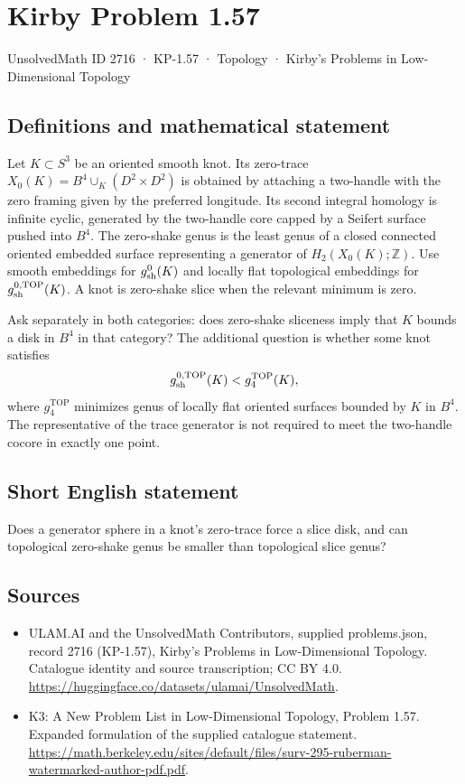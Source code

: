 \documentclass[11pt,a4paper]{article}
\begin{document}
\section*{Kirby Problem 1.57}\label{2716}
{\small UnsolvedMath ID 2716 · KP-1.57 · Topology · Kirby's Problems in Low-Dimensional Topology}
\subsection{Definitions and mathematical statement}
Let $K\subset S^3$ be an oriented smooth knot. Its zero-trace
$X_0(K)=B^4\cup_K(D^2\times D^2)$ is obtained by attaching a two-handle with
the zero framing given by the preferred longitude. Its second integral homology
is infinite cyclic, generated by the two-handle core capped by a Seifert surface
pushed into $B^4$.
The zero-shake genus is the least genus of a closed connected oriented embedded
surface representing a generator of $H_2(X_0(K);\mathbb Z)$. Use smooth
embeddings for $g^0_{\rm sh}(K)$ and locally flat topological embeddings for
$g^{0,\mathrm{TOP}}_{\rm sh}(K)$. A knot is zero-shake slice when the relevant
minimum is zero.

Ask separately in both categories: does zero-shake sliceness imply that $K$
bounds a disk in $B^4$ in that category? The additional question is whether some
knot satisfies
\[
g^{0,\mathrm{TOP}}_{\rm sh}(K)<g^{\mathrm{TOP}}_4(K),
\]
where $g^{\mathrm{TOP}}_4$ minimizes genus of locally flat oriented surfaces
bounded by $K$ in $B^4$. The representative of the trace generator is not
required to meet the two-handle cocore in exactly one point.
\subsection{Short English statement}
Does a generator sphere in a knot's zero-trace force a slice disk, and can topological zero-shake genus be smaller than topological slice genus?
\subsection{Sources}
\begin{itemize}
\item[S1] ULAM.AI and the UnsolvedMath Contributors, supplied problems.json, record 2716 (KP-1.57), Kirby's Problems in Low-Dimensional Topology. Catalogue identity and source transcription; CC BY 4.0.
\url{https://huggingface.co/datasets/ulamai/UnsolvedMath}.
\item[S2] K3: A New Problem List in Low-Dimensional Topology, Problem 1.57. Expanded formulation of the supplied catalogue statement.
\url{https://math.berkeley.edu/sites/default/files/surv-295-ruberman-watermarked-author-pdf.pdf}.
\end{itemize}
\end{document}
